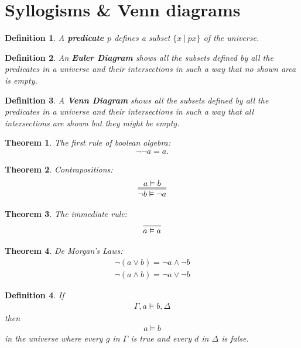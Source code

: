 \documentclass{article}
\theoremstyle{sltheorem}
\newtheorem{definition}{Definition}
\newtheorem{theorem}{Theorem}
\begin{document}
\section{Syllogisms \& Venn diagrams}
\begin{definition}
    A \textbf{predicate $p$} defines a subset $\{x\:|\:p x\}$ of the universe.
\end{definition}
\begin{definition}
    An \textbf{Euler Diagram} shows all the subsets defined by all the predicates in a universe and their intersections in such a way that no shown area is empty.
\end{definition}
\begin{definition}
    A \textbf{Venn Diagram} shows all the subsets defined by all the predicates in a universe and their intersections in such a way that all intersections are shown but they might be empty.
\end{definition}
\begin{theorem}
    The first rule of boolean algebra:
    \begin{gather*}
        \neg\neg a = a.
    \end{gather*}
\end{theorem}
\begin{theorem}
    Contrapositions:
    \begin{gather*}
        \infer={\neg b\vDash\neg a}{a\vDash b}
    \end{gather*}
\end{theorem}
\begin{theorem}
    The immediate rule:
    \begin{gather*}
        \infer{a\vDash a}{}
    \end{gather*}
\end{theorem}
\begin{theorem}
    De Morgan's Laws:
    \begin{gather*}
        \neg(a\vee b) = \neg a \wedge \neg b\\
        \neg(a\wedge b) = \neg a \vee \neg b
    \end{gather*}
\end{theorem}
\begin{definition}
    If 
    \begin{gather*}
        \Gamma, a \vDash b, \Delta
    \end{gather*}
    then 
    \begin{gather*}
        a\vDash b
    \end{gather*} 
    in the universe where every $g$ in $\Gamma$ is true 
    and every $d$ in $\Delta$ is false.
\end{definition}
\end{document}
